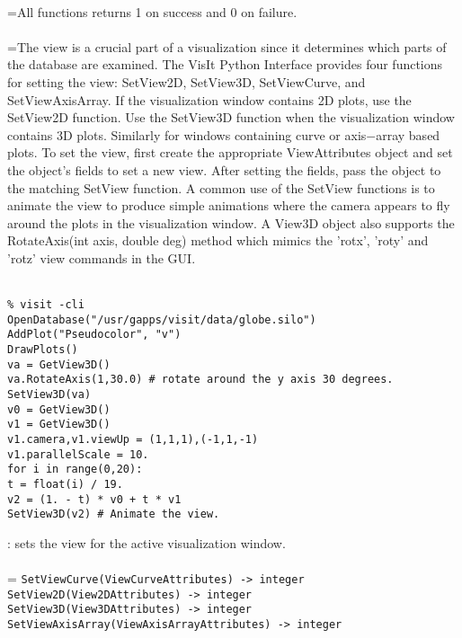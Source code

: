 \documentclass[10pt,a4paper]{report}
\begin{document}
 \\ 
\hangindent=\parindent All functions returns 1 on success and 0 on failure. \\[-3mm] 

 \\ 
\hangindent=\parindent The view is a crucial part of a visualization since it determines which parts of the database are examined. The VisIt Python Interface provides four functions for setting the view: SetView2D, SetView3D, SetViewCurve, and SetViewAxisArray. If the visualization window contains 2D plots, use the SetView2D function. Use the SetView3D function when the visualization window contains 3D plots.  Similarly for windows containing curve or axis$-$array based plots.  To set the view, first create the appropriate ViewAttributes object and set the object's fields to set a new view. After setting the fields, pass the object to the matching SetView function. A common use of the SetView functions is to animate the view to produce simple animations where the camera appears to fly around the plots in the visualization window. A View3D object also supports the RotateAxis(int axis, double deg) method which mimics the 'rotx', 'roty' and 'rotz' view commands in the GUI. \\[-3mm] 

\\[-6mm]
\begin{verbatim}% visit -cli
OpenDatabase("/usr/gapps/visit/data/globe.silo")
AddPlot("Pseudocolor", "v")
DrawPlots()
va = GetView3D()
va.RotateAxis(1,30.0) # rotate around the y axis 30 degrees.
SetView3D(va)
v0 = GetView3D()
v1 = GetView3D()
v1.camera,v1.viewUp = (1,1,1),(-1,1,-1)
v1.parallelScale = 10.
for i in range(0,20):
t = float(i) / 19.
v2 = (1. - t) * v0 + t * v1
SetView3D(v2) # Animate the view.
\end{verbatim}
\newpage


{}
: sets the view for the active visualization window.\\[-3mm]

 \\ 
\hangindent=\parindent 
\verb!SetViewCurve(ViewCurveAttributes) -> integer!\\ 
\verb!SetView2D(View2DAttributes) -> integer!\\ 
\verb!SetView3D(View3DAttributes) -> integer!\\ 
\verb!SetViewAxisArray(ViewAxisArrayAttributes) -> integer!\\ [-3mm]
\end{document}
